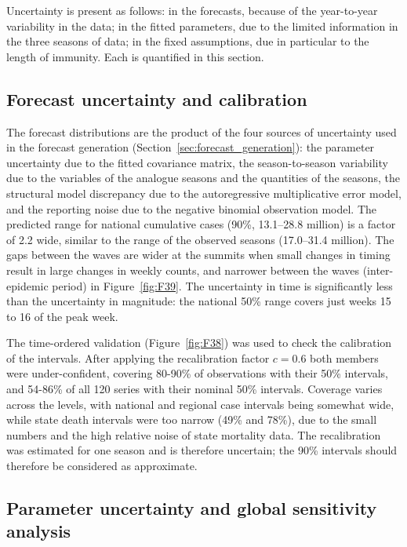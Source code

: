 \documentclass[12pt,a4paper]{article}
\theoremstyle{definition}
\theoremstyle{remark}
\begin{document}
Uncertainty is present as follows: in the forecasts, because of the year-to-year variability in the data; in the fitted parameters, due to the limited information in the three seasons of data; in the fixed assumptions, due in particular to the length of immunity. Each is quantified in this section.

\subsection{Forecast uncertainty and calibration}\label{sec:forecast_uncertainty}

The forecast distributions are the product of the four sources of uncertainty used in the forecast generation (Section~\ref{sec:forecast_generation}): the parameter uncertainty due to the fitted covariance matrix, the season-to-season variability due to the variables of the analogue seasons and the quantities of the seasons, the structural model discrepancy due to the autoregressive multiplicative error model, and the reporting noise due to the negative binomial observation model. The predicted range for national cumulative cases (90\%, 13.1--28.8 million) is a factor of 2.2 wide, similar to the range of the observed seasons (17.0--31.4 million). The gaps between the waves are wider at the summits when small changes in timing result in large changes in weekly counts, and narrower between the waves (inter-epidemic period) in Figure~\ref{fig:F39}. The uncertainty in time is significantly less than the uncertainty in magnitude: the national 50\% range covers just weeks 15 to 16 of the peak week.

The time-ordered validation (Figure~\ref{fig:F38}) was used to check the calibration of the intervals. After applying the recalibration factor $c=0.6$ both members were under-confident, covering 80-90\% of observations with their 50\% intervals, and 54-86\% of all 120 series with their nominal 50\% intervals. Coverage varies across the levels, with national and regional case intervals being somewhat wide, while state death intervals were too narrow (49\% and 78\%), due to the small numbers and the high relative noise of state mortality data. The recalibration was estimated for one season and is therefore uncertain; the 90\% intervals should therefore be considered as approximate.

\subsection{Parameter uncertainty and global sensitivity analysis}\label{sec:sensitivity}
\end{document}
